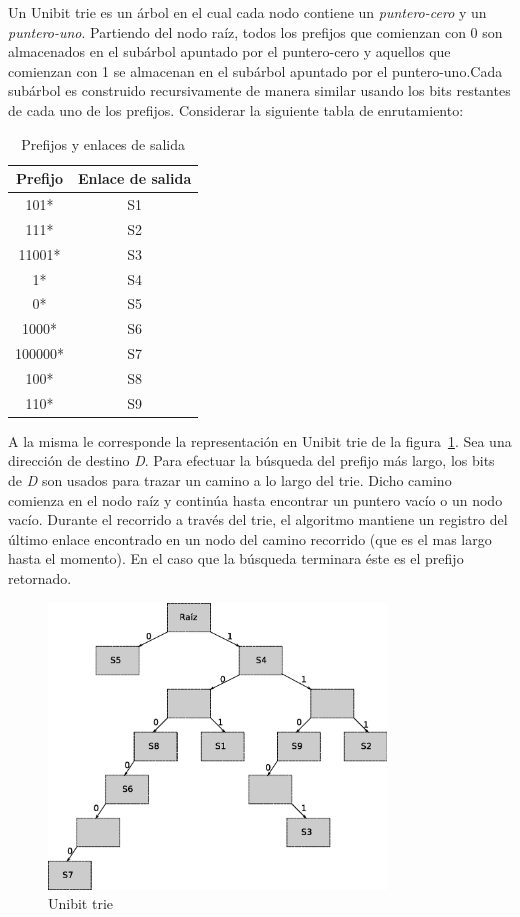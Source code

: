 Un Unibit trie es un árbol en el cual cada nodo contiene un \textit{puntero-cero }y un \textit{puntero-uno}. Partiendo del nodo raíz, todos los prefijos que comienzan con 0 son almacenados en el subárbol apuntado por el puntero-cero y aquellos que comienzan con 1 se almacenan en el subárbol apuntado por el puntero-uno.Cada subárbol es construido recursivamente de manera similar usando los bits restantes de cada uno de los prefijos.
Considerar la siguiente tabla de enrutamiento:
\begin{table}[h]
\begin{center}
	\begin{tabular}{|c|c|} \hline
		\textbf{Prefijo} & \textbf{Enlace de salida} \\ \hline
		101* & S1 \\
		111* & S2 \\
		11001* & S3 \\
		1* & S4 \\
		0* & S5 \\
		1000* & S6 \\
		100000* & S7 \\
		100* & S8 \\
		110* & S9 \\	\hline
	\end{tabular}
	\caption{Prefijos y enlaces de salida}
	\label{tab:prefgw}	
\end{center}
\end{table}



A la misma le corresponde la representación en Unibit trie de la figura~\ref{fig:trie}.
Sea una dirección de destino \textit{D}. Para efectuar la búsqueda del prefijo más largo, los bits de \textit{D} son usados para trazar un camino a lo largo del trie. Dicho camino comienza en el nodo raíz y continúa hasta encontrar un puntero vacío o un nodo vacío. Durante el recorrido a través del trie, el algoritmo mantiene un registro del último enlace encontrado en un nodo del camino recorrido (que es el mas largo hasta el momento). En el caso que la búsqueda terminara éste es el prefijo retornado.

\begin{figure}[h]
  \centering
	\includegraphics[width=0.80\textwidth]{2-sistema/graf/trie.eps}
  \caption{Unibit trie}
  \label{fig:trie}
\end{figure}


